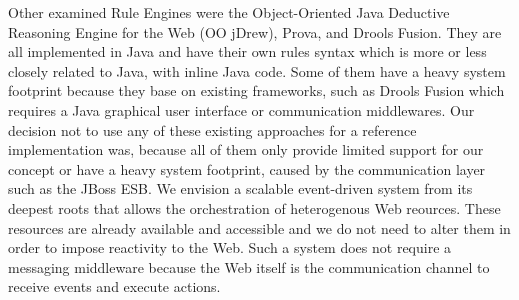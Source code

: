 Other examined Rule Engines were the \textrm{Object-Oriented Java Deductive Reasoning Engine for the Web} (\textrm{OO jDrew}), \textrm{Prova}, and \textrm{Drools Fusion}.
They are all implemented in \textrm{Java} and have their own rules syntax which is more or less closely related to \textrm{Java}, with inline \textrm{Java} code.
Some of them have a heavy system footprint because they base on existing frameworks, such as \textrm{Drools Fusion} which requires a Java graphical user interface or communication middlewares.
Our decision not to use any of these existing approaches for a reference implementation was, because all of them only provide limited support for our concept or have a heavy system footprint, caused by the communication layer such as the {JBoss ESB}.
We envision a scalable event-driven system from its deepest roots that allows the orchestration of heterogenous Web reources.
These resources are already available and accessible and we do not need to alter them in order to impose reactivity to the Web.
Such a system does not require a messaging middleware because the Web itself is the communication channel to receive events and execute actions.


